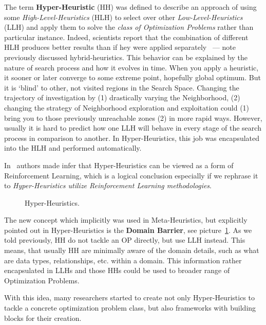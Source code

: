 The term \textbf{Hyper-Heuristic} (HH) was defined to describe an approach of using some \textit{High-Level-Heuristics} (HLH) to select over other \textit{Low-Level-Heuristics} (LLH) and apply them to solve the \textit{class of Optimization Problems} rather than particular instance. Indeed, scientists report that the combination of different HLH produces better results than if hey were applied separately~\cite{drake2019recent} — note previously discussed hybrid-heuristics.
This behavior can be explained by the nature of search process and how it evolves in time. When you apply a heuristic, it sooner or later converge to some extreme point, hopefully global optimum. But it is `blind' to other, not visited regions in the Search Space. Changing the trajectory of investigation by (1) drastically varying the Neighborhood, (2) changing the strategy of Neighborhood exploration and exploitation could (1) bring you to those previously unreachable zones (2) in more rapid ways. However, usually it is hard to predict how one LLH will behave in every stage of the search process in comparison to another. In Hyper-Heuristics, this job was encapsulated into the HLH and performed automatically. 

In~\cite{moriarty1999evolutionary} authors made infer that Hyper-Heuristics can be viewed as a form of Reinforcement Learning, which is a logical conclusion especially if we rephrase it to \textit{Hyper-Heuristics utilize Reinforcement Learning methodologies}.

\begin{figure}
	\centering
	
	\caption[Hyper-Heuristics]{Hyper-Heuristics.}
	\label{bg:pic:HH}
\end{figure}

The new concept which implicitly was used in Meta-Heuristics, but explicitly pointed out in Hyper-Heuristics is the \textbf{Domain Barrier}, see picture~\ref{bg:pic:HH}.
As we told previously, HH do not tackle an OP directly, but use LLH instead. This means, that usually HH are minimally aware of the domain details, such as what are data types, relationships, etc. within a domain. This information rather encapsulated in LLHs and those HHs could be used to broader range of Optimization Problems.

With this idea, many researchers started to create not only Hyper-Heuristics to tackle a concrete optimization problem class, but also frameworks with building blocks for their creation.


